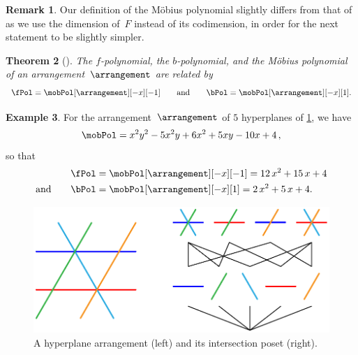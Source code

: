 \documentclass{amsart}
\newtheorem{theorem}{Theorem}[section]
\theoremstyle{definition}
\newtheorem{example}[theorem]{Example}
\newtheorem{remark}[theorem]{Remark}
\begin{document}
\begin{remark}
Our definition of the M\"obius polynomial slightly differs from that of \cite{Zaslavsky} as we use the dimension of~$F$ instead of its codimension, in order for the next statement to be slightly simpler.
\end{remark}

\begin{theorem}[{\cite[Thm.~A]{Zaslavsky}}]
\label{thm:Zaslavsky}
The $f$-polynomial, the $b$-polynomial, and the M\"obius polynomial of an arrangement~$\arrangement$ are related by
\[
\fPol = \mobPol[\arrangement][-x][-1]
\qquad\text{and}\qquad
\bPol = \mobPol[\arrangement][-x][1].
\]
\end{theorem}

\begin{example}
For the arrangement~$\arrangement$ of $5$ hyperplanes of \cref{fig:arrangement}, we have
\[
\mobPol = x^2y^2 - 5x^2y + 6x^2 + 5xy - 10x + 4 \, ,
\]
so that
\begin{align*}
\fPol & = \mobPol[\arrangement][-x][-1] = 12 \, x^2 + 15 \, x + 4 \\
\text{and}\qquad
\bPol & = \mobPol[\arrangement][-x][1] = 2 \, x^2 + 5 \, x + 4.
\end{align*}
%
\begin{figure}
	\centerline{\includegraphics[scale=.9]{intersectionPoset}}
	\caption{A hyperplane arrangement (left) and its intersection poset (right).}
	\label{fig:arrangement}
\end{figure}
\end{example}
\end{document}
